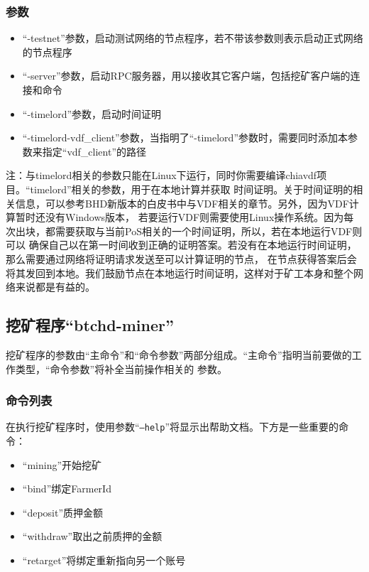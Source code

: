 \subsubsection{参数}
\begin{itemize}
    \item ``-testnet''参数，启动测试网络的节点程序，若不带该参数则表示启动正式网络的节点程序
    \item ``-server''参数，启动RPC服务器，用以接收其它客户端，包括挖矿客户端的连接和命令
    \item ``-timelord''参数，启动时间证明
    \item ``-timelord-vdf\_client''参数，当指明了``-timelord''参数时，需要同时添加本参数来指定``vdf\_client''的路径
\end{itemize}
\begin{flushleft}
    注：与timelord相关的参数只能在Linux下运行，同时你需要编译chiavdf项目。``timelord''相关的参数，用于在本地计算并获取
    时间证明。关于时间证明的相关信息，可以参考BHD新版本的白皮书中与VDF相关的章节。另外，因为VDF计算暂时还没有Windows版本，
    若要运行VDF则需要使用Linux操作系统。因为每次出块，都需要获取与当前PoS相关的一个时间证明，所以，若在本地运行VDF则可以
    确保自己以在第一时间收到正确的证明答案。若没有在本地运行时间证明，那么需要通过网络将证明请求发送至可以计算证明的节点，
    在节点获得答案后会将其发回到本地。我们鼓励节点在本地运行时间证明，这样对于矿工本身和整个网络来说都是有益的。
\end{flushleft}
\subsection{挖矿程序``btchd-miner''}
\begin{flushleft}
    挖矿程序的参数由``主命令''和``命令参数''两部分组成。``主命令''指明当前要做的工作类型，``命令参数''将补全当前操作相关的
    参数。
\end{flushleft}
\subsubsection{命令列表}
\begin{flushleft}
    在执行挖矿程序时，使用参数``\texttt{--help}''将显示出帮助文档。下方是一些重要的命令：
\end{flushleft}
\begin{itemize}
    \item ``mining''开始挖矿
    \item ``bind''绑定FarmerId
    \item ``deposit''质押金额
    \item ``withdraw''取出之前质押的金额
    \item ``retarget''将绑定重新指向另一个账号
\end{itemize}
